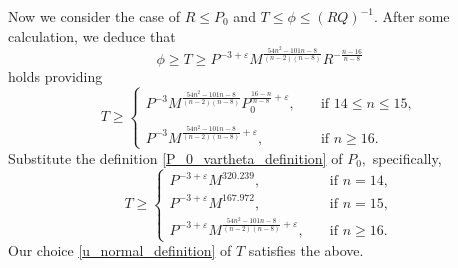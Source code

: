 \documentclass[12pt]{amsart}
\theoremstyle{definition}
\numberwithin{equation}{section}
\begin{document}
Now we consider the case of $R \leq P_0$ and $T \leq \phi \leq (RQ)^{-1}.$ 
After some calculation, we deduce that
\begin{equation*}
    \phi \geq T \geq P^{-3+\varepsilon}M^{\frac{54n^2-101n-8}{(n-2)(n-8)}}R^{-\frac{n-16}{n-8}}
\end{equation*}
holds providing
\begin{equation*}
    T \geq
    \begin{cases}
    P^{-3}M^{\frac{54n^2-101n-8}{(n-2)(n-8)}}P_0^{\frac{16-n}{n-8}+\varepsilon}, \quad &\text{if }14 \leq n \leq 15,\\
        \quad\\
    P^{-3}M^{\frac{54n^2-101n-8}{(n-2)(n-8)}+\varepsilon}, \quad &\text{if }n\geq 16.
    \end{cases}
\end{equation*}
Substitute the definition \eqref{P_0_vartheta_definition} of $P_0,$ specifically, 
\begin{equation}   %
\label{u_from_small_denominator_large_distance}
    T \geq
    \begin{cases}
        P^{-3+\varepsilon}M^{320.239}, \quad &\text{if } n =14,\\
        P^{-3+\varepsilon}M^{167.972}, \quad &\text{if } n =15,\\
        P^{-3+\varepsilon}M^{\frac{54n^2-101n-8}{(n-2)(n-8)}+\varepsilon}, \quad &\text{if }n\geq 16.
    \end{cases}
\end{equation}
Our choice  \eqref{u_normal_definition} of $T$ satisfies the above.
\end{document}
